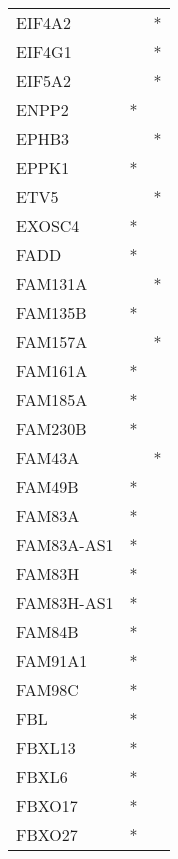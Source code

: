 \begin{longtable}{lcc}
EIF4A2           &                &          * \\
EIF4G1           &                &          * \\
EIF5A2           &                &          * \\
ENPP2            &              * &            \\
EPHB3            &                &          * \\
EPPK1            &              * &            \\
ETV5             &                &          * \\
EXOSC4           &              * &            \\
FADD             &              * &            \\
FAM131A          &                &          * \\
FAM135B          &              * &            \\
FAM157A          &                &          * \\
FAM161A          &              * &            \\
FAM185A          &              * &            \\
FAM230B          &              * &            \\
FAM43A           &                &          * \\
FAM49B           &              * &            \\
FAM83A           &              * &            \\
FAM83A-AS1       &              * &            \\
FAM83H           &              * &            \\
FAM83H-AS1       &              * &            \\
FAM84B           &              * &            \\
FAM91A1          &              * &            \\
FAM98C           &              * &            \\
FBL              &              * &            \\
FBXL13           &              * &            \\
FBXL6            &              * &            \\
FBXO17           &              * &            \\
FBXO27           &              * &            \\

\end{longtable}
